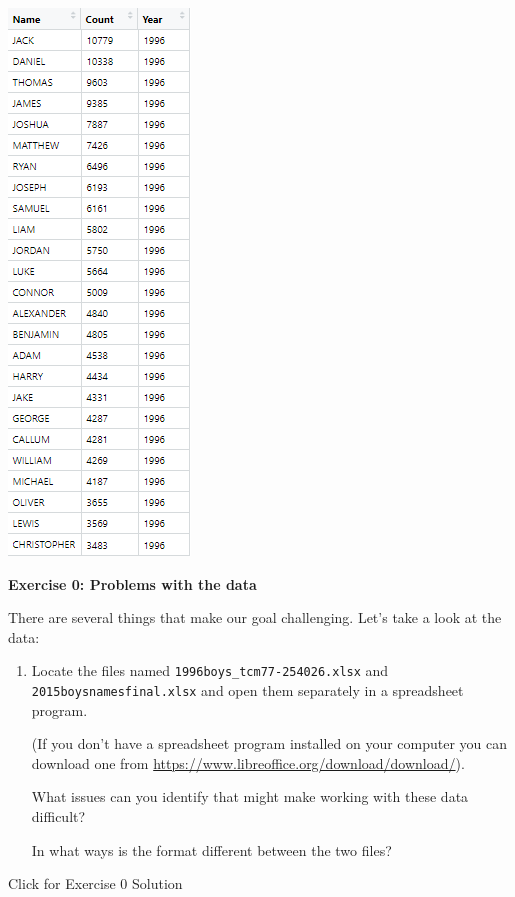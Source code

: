 \documentclass[]{book}
\begin{document}
\includegraphics{R/RDataWrangling/images/goal.png}

\textbf{Exercise 0: Problems with the data}

There are several things that make our goal challenging. Let's take a look at the data:

\begin{enumerate}
\def\labelenumi{\arabic{enumi}.}
\item
  Locate the files named \texttt{1996boys\_tcm77-254026.xlsx} and
  \texttt{2015boysnamesfinal.xlsx} and open them separately in a
  spreadsheet program.

  (If you don't have a spreadsheet program installed on
  your computer you can download one from
  \url{https://www.libreoffice.org/download/download/}).

  What issues can you identify that might make working
  with these data difficult?

  In what ways is the format different between the two files?
\end{enumerate}

{Click for Exercise 0 Solution}
\end{document}
